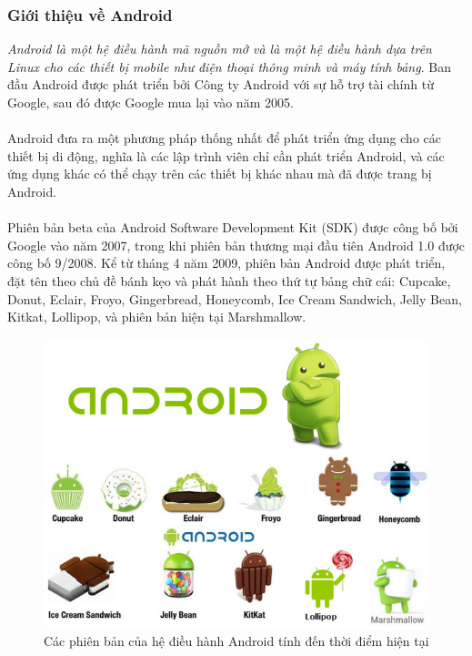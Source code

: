 \documentclass[a4paper]{article}
\begin{document}
\subsubsection{Giới thiệu về Android}
\textit{Android là một hệ điều hành mã nguồn mở và là một hệ điều hành dựa trên Linux cho các thiết bị mobile như điện thoại thông minh và máy tính bảng}. Ban đầu Android được phát triển bởi Công ty Android với sự hỗ trợ tài chính từ Google, sau đó được Google mua lại vào năm 2005.\\
\\
Android đưa ra một phương pháp thống nhất để phát triển ứng dụng cho các thiết bị di động, nghĩa là các lập trình viên chỉ cần phát triển Android, và các ứng dụng khác có thể chạy trên các thiết bị khác nhau mà đã được trang bị Android.\\
\\
Phiên bản beta của Android Software Development Kit (SDK) được công bố bởi Google vào năm 2007, trong khi phiên bản thương mại đầu tiên Android 1.0 được công bố 9/2008.  Kể từ tháng 4 năm 2009, phiên bản Android được phát triển, đặt tên theo chủ đề bánh kẹo và phát hành theo thứ tự bảng chữ cái: Cupcake, Donut, Eclair, Froyo, Gingerbread, Honeycomb, Ice Cream Sandwich, Jelly Bean, Kitkat, Lollipop, và phiên bản hiện tại Marshmallow.
\begin{center}
    \begin{figure}[h]
    \begin{center}
     \includegraphics[scale=.4]{android_version.jpg}
    \end{center}
    \caption{Các phiên bản của hệ điều hành Android tính đến thời điểm hiện tại}
    \label{refhinh1}
    \end{figure}
\end{center}
\end{document}
